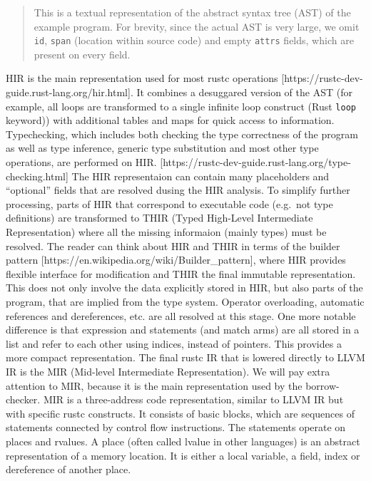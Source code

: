 \begin{quote}
This is a textual representation of the abstract syntax tree (AST) of
the example program. For brevity, since the actual AST is very large, we
omit \texttt{id}, \texttt{span} (location within source code) and empty
\texttt{attrs} fields, which are present on every field.
\end{quote}

HIR is the main representation used for most rustc operations
{[}https://rustc-dev-guide.rust-lang.org/hir.html{]}. It combines a
desuggared version of the AST (for example, all loops are transformed to
a single infinite loop construct (Rust \texttt{loop} keyword)) with
additional tables and maps for quick access to information.
Typechecking, which includes both checking the type correctness of the
program as well as type inference, generic type substitution and most
other type operations, are performed on HIR.
{[}https://rustc-dev-guide.rust-lang.org/type-checking.html{]} The HIR
representaion can contain many placeholders and ``optional'' fields that
are resolved dusing the HIR analysis. To simplify further processing,
parts of HIR that correspond to executable code (e.g.~not type
definitions) are transformed to THIR (Typed High-Level Intermediate
Representation) where all the missing informaion (mainly types) must be
resolved. The reader can think about HIR and THIR in terms of the
builder pattern {[}https://en.wikipedia.org/wiki/Builder\_pattern{]},
where HIR provides flexible interface for modification and THIR the
final immutable representation. This does not only involve the data
explicitly stored in HIR, but also parts of the program, that are
implied from the type system. Operator overloading, automatic references
and dereferences, etc. are all resolved at this stage. One more notable
difference is that expression and statements (and match arms) are all
stored in a list and refer to each other using indices, instead of
pointers. This provides a more compact representation. The final rustc
IR that is lowered directly to LLVM IR is the MIR (Mid-level
Intermediate Representation). We will pay extra attention to MIR,
because it is the main representation used by the borrow-checker. MIR is
a three-address code representation, similar to LLVM IR but with
specific rustc constructs. It consists of basic blocks, which are
sequences of statements connected by control flow instructions. The
statements operate on places and rvalues. A place (often called lvalue
in other languages) is an abstract representation of a memory location.
It is either a local variable, a field, index or dereference of another
place.

